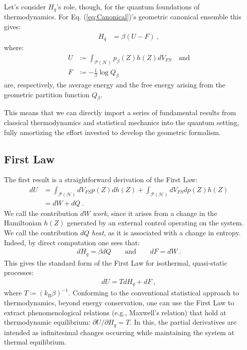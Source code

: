 \documentclass[draft,nofootinbib,pre,twocolumn,showpacs,showkeys,groupaddress,preprintnumbers,floatfix]{revtex4-1}
\newcommand{\kB}{k_\text{B}}
\newcommand{\1}{\mathbbm{1}}
\newcommand{\intP}{\int_{\mathcal{P}(\mathcal{H})} \!\!\!\!\!\!\!\!\!}
\begin{document}
Let's consider $H_q$'s role, though, for the quantum foundations of
thermodynamics. For Eq. (\ref{eq:Canonical})'s geometric canonical ensemble
this gives:
\begin{align*}
H_q & = \beta (U - F) ~,
\end{align*}
where:
\begin{align*}
U & \coloneqq \intP p_\beta(Z) h(Z)dV_{FS} \quad \text{and}\\
F & \coloneqq -\frac{1}{\beta}\log Q_\beta
\end{align*}
are, respectively, the average energy and the free energy arising from the
geometric partition function $Q_\beta$.

This means that we can directly import a series of fundamental results from
classical thermodynamics and statistical mechanics into the quantum setting,
fully amortizing the effort invested to develop the geometric formalism.

\subsection{First Law}

The first result is a straightforward derivation of the First Law:
\begin{align}
dU & = \intP dV_{FS} p(Z) dh(Z) + \intP dV_{FS} dp(Z)h(Z) \nonumber \\
  & = dW + dQ 
  ~.
  \label{eq:FirstLaw}
\end{align}
We call the contribution $dW$ \emph{work}, since it arises from a change
in the Hamiltonian $h(Z)$ generated by an external control operating on the
system. We call the contribution $dQ$ \emph{heat}, as it is associated
with a change in entropy. Indeed, by direct computation one sees that:
\begin{align*}
dH_q  = \beta dQ \qquad \text{and} \qquad dF = dW
  ~.
\end{align*}
This gives the standard form of the First Law for isothermal, quasi-static
processes:
\begin{align*}
dU = TdH_q + dF
  ~,
\end{align*}
where $T \coloneqq \left( \kB \beta \right)^{-1}$. Conforming to the
conventional statistical approach to thermodynamics, beyond energy
conservation, one can use the First Law to extract phenomenological relations
(e.g., Maxwell's relation) that hold at thermodynamic equilibrium:
$\partial U / \partial H_q = T$. In this, the partial derivatives are
intended as infinitesimal changes occurring while maintaining the system at
thermal equilibrium.
\end{document}
